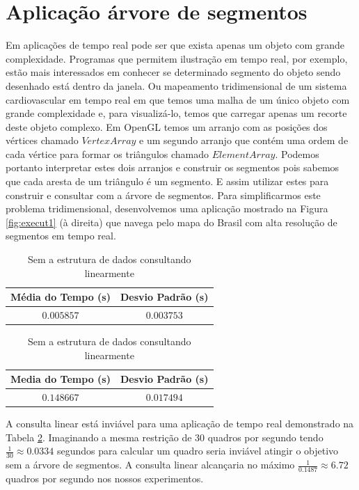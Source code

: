 \section{Aplicação árvore de segmentos}\label{cap:application-segment}
Em aplicações de tempo real pode ser que exista apenas um objeto com grande complexidade. Programas que permitem ilustração em tempo real, por exemplo, estão mais interessados em conhecer se determinado segmento do objeto sendo desenhado está dentro da janela. Ou mapeamento tridimensional de um sistema cardiovascular em tempo real em que temos uma malha de um único objeto com grande complexidade e, para visualizá-lo, temos que carregar apenas um recorte deste objeto complexo. Em OpenGL \cite{opengl} temos um arranjo com as posições dos vértices chamado $Vertex Array$ e um segundo arranjo que contém uma ordem de cada vértice para formar os triângulos chamado $Element Array$. Podemos portanto interpretar estes dois arranjos e construir os segmentos pois sabemos que cada aresta de um triângulo é um segmento. E assim utilizar estes para construir e consultar com a árvore de segmentos. Para simplificarmos este problema tridimensional, desenvolvemos uma aplicação mostrado na Figura \ref{fig:execut1} (à direita) que navega pelo mapa do Brasil com alta resolução de segmentos em tempo real. 

\begin{table}[h!]
\centering
\parbox{.5\linewidth}{
\centering
\begin{tabular}{| c c |} 
 \hline
 Média do Tempo (s) & Desvio Padrão (s) \\%
 \hline
 $0.005857$  & $0.003753$ \\
\hline
\end{tabular}
\caption{Utilizando a estrutura de dados para consultar os segmentos}
\label{table:3}
}
\parbox{.5\linewidth}{
\centering
\begin{tabular}{| c c |} 
 \hline
 Media do Tempo (s) & Desvio Padrão (s) \\%
 \hline
 $0.148667$  & $0.017494$ \\
\hline
\end{tabular}
\caption{Sem a estrutura de dados consultando linearmente}
\label{table:4}
}
\end{table}

A consulta linear está inviável para uma aplicação de tempo real demonstrado na Tabela \ref{table:4}. Imaginando a mesma restrição de 30 quadros por segundo tendo $\frac{1}{30} \approx 0.0334$ segundos para calcular um quadro seria inviável atingir o objetivo sem a árvore de segmentos. A consulta linear alcançaria no máximo $\frac{1}{0.1487} \approx 6.72$ quadros por segundo nos nossos experimentos.
